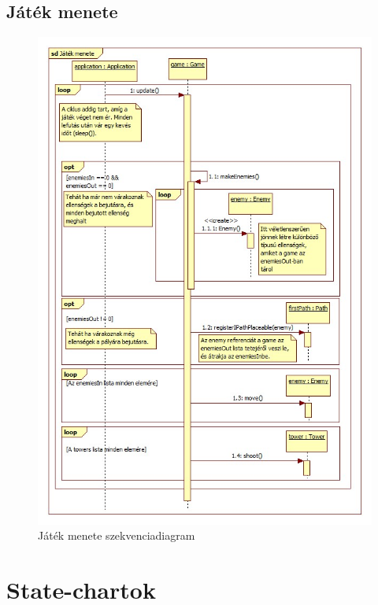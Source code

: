 \subsection{Játék menete}
\begin{figure}[H]
\begin{center}
\includegraphics[width=17cm]{chapters/chapter04/images/Jatek_menete.jpg}
\caption{Játék menete szekvenciadiagram}
\label{fig:Játék_menete}
\end{center}
\end{figure}


\section{State-chartok}

